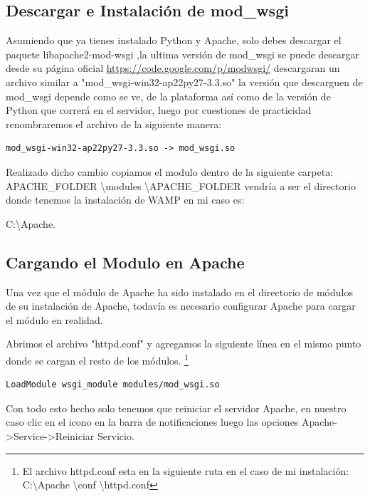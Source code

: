\subsection{Descargar e Instalación de mod\_wsgi}

 Asumiendo que ya  tienes instalado Python y Apache, solo debes descargar el paquete  libapache2-mod-wsgi ,la ultima versión de mod\_wsgi se puede descargar desde su  página oficial  \url{https://code.google.com/p/modwsgi/} descargaran un archivo  similar a "mod\_wsgi-win32-ap22py27-3.3.so" la versión que descarguen de mod\_wsgi  depende como se ve, de la plataforma así como de la versión de Python que  correrá en el servidor, luego por cuestiones de practicidad renombraremos  el archivo de la siguiente manera:

\begin{lstlisting}[style=consola]
    mod_wsgi-win32-ap22py27-3.3.so -> mod_wsgi.so
\end{lstlisting}
\vspace{0.1cm}

Realizado dicho cambio copiamos el modulo dentro de la siguiente carpeta: APACHE\_FOLDER \textbackslash modules \textbackslash APACHE\_FOLDER vendría a ser el directorio donde tenemos la instalación de WAMP en mi caso es: 

C:\textbackslash Apache.

\subsection{Cargando el Modulo en Apache}

Una vez que el módulo de Apache ha sido instalado en el directorio de módulos de su instalación de Apache, todavía es necesario configurar Apache para cargar el módulo en realidad.

Abrimos el archivo "httpd.conf" y agregamos la siguiente línea en el mismo punto donde se cargan el resto de los módulos. \footnote {El archivo httpd.conf esta en la siguiente ruta en el caso de mi instalación: C:\textbackslash Apache \textbackslash conf \textbackslash httpd.conf}

\begin{lstlisting}[style=consola]
    LoadModule wsgi_module modules/mod_wsgi.so
\end{lstlisting}
\vspace{0.1cm}

Con todo esto hecho solo tenemos que reiniciar el servidor Apache, en nuestro  caso clic en el icono en la barra de notificaciones luego las opciones  Apache->Service->Reiniciar Servicio. 

